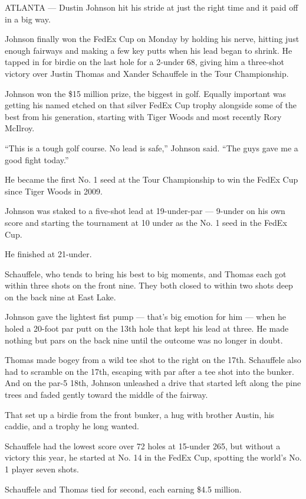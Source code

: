 ATLANTA --- Dustin Johnson hit his stride at just the right time and it
paid off in a big way.

Johnson finally won the FedEx Cup on Monday by holding his nerve,
hitting just enough fairways and making a few key putts when his lead
began to shrink. He tapped in for birdie on the last hole for a 2-under
68, giving him a three-shot victory over Justin Thomas and Xander
Schauffele in the Tour Championship.

Johnson won the \$15 million prize, the biggest in golf. Equally
important was getting his named etched on that silver FedEx Cup trophy
alongside some of the best from his generation, starting with Tiger
Woods and most recently Rory McIlroy.

``This is a tough golf course. No lead is safe,'' Johnson said. ``The
guys gave me a good fight today.''

He became the first No. 1 seed at the Tour Championship to win the FedEx
Cup since Tiger Woods in 2009.

Johnson was staked to a five-shot lead at 19-under-par --- 9-under on
his own score and starting the tournament at 10 under as the No. 1 seed
in the FedEx Cup.

He finished at 21-under.

Schauffele, who tends to bring his best to big moments, and Thomas each
got within three shots on the front nine. They both closed to within two
shots deep on the back nine at East Lake.

Johnson gave the lightest fist pump --- that's big emotion for him ---
when he holed a 20-foot par putt on the 13th hole that kept his lead at
three. He made nothing but pars on the back nine until the outcome was
no longer in doubt.

Thomas made bogey from a wild tee shot to the right on the 17th.
Schauffele also had to scramble on the 17th, escaping with par after a
tee shot into the bunker. And on the par-5 18th, Johnson unleashed a
drive that started left along the pine trees and faded gently toward the
middle of the fairway.

That set up a birdie from the front bunker, a hug with brother Austin,
his caddie, and a trophy he long wanted.

Schauffele had the lowest score over 72 holes at 15-under 265, but
without a victory this year, he started at No. 14 in the FedEx Cup,
spotting the world's No. 1 player seven shots.

Schauffele and Thomas tied for second, each earning \$4.5 million.

